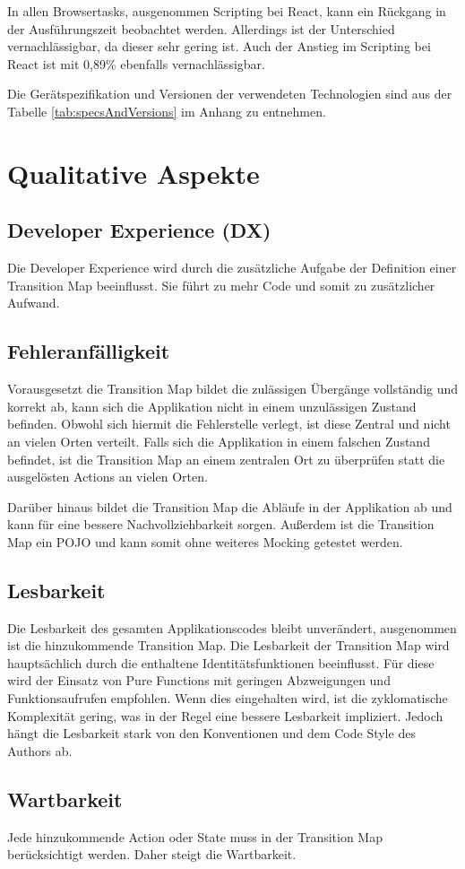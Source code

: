 In allen Browsertasks, ausgenommen Scripting bei React, kann ein Rückgang in der Ausführungszeit beobachtet werden. Allerdings ist der Unterschied vernachlässigbar, da dieser sehr gering ist. Auch der Anstieg im Scripting bei React ist mit 0,89\% ebenfalls vernachlässigbar.

Die Gerätspezifikation und Versionen der verwendeten Technologien sind aus der Tabelle \ref{tab:specsAndVersions} im Anhang zu entnehmen.

\section{Qualitative Aspekte}

\subsection{Developer Experience (DX)}
Die Developer Experience wird durch die zusätzliche Aufgabe der Definition einer Transition Map beeinflusst. Sie führt zu mehr Code und somit zu zusätzlicher Aufwand.

\subsection{Fehleranfälligkeit}
Vorausgesetzt die Transition Map bildet die zulässigen Übergänge vollständig und korrekt ab, kann sich die Applikation nicht in einem unzulässigen Zustand befinden. Obwohl sich hiermit die Fehlerstelle verlegt, ist diese Zentral und nicht an vielen Orten verteilt. Falls sich die Applikation in einem falschen Zustand befindet, ist die Transition Map an einem zentralen Ort zu überprüfen statt die ausgelösten Actions an vielen Orten.

Darüber hinaus bildet die Transition Map die Abläufe in der Applikation ab und kann für eine bessere Nachvollziehbarkeit sorgen. Außerdem ist die Transition Map ein POJO und kann somit ohne weiteres Mocking getestet werden.

\subsection{Lesbarkeit}
Die Lesbarkeit des gesamten Applikationscodes bleibt unverändert, ausgenommen ist die hinzukommende Transition Map. Die Lesbarkeit der Transition Map wird hauptsächlich durch die enthaltene Identitätsfunktionen beeinflusst. Für diese wird der Einsatz von Pure Functions mit geringen Abzweigungen und Funktionsaufrufen empfohlen. Wenn dies eingehalten wird, ist die zyklomatische Komplexität gering, was in der Regel eine bessere Lesbarkeit impliziert. Jedoch hängt die Lesbarkeit stark von den Konventionen und dem Code Style des Authors ab.

\subsection{Wartbarkeit}
Jede hinzukommende Action oder State muss in der Transition Map berücksichtigt werden. Daher steigt die Wartbarkeit.

